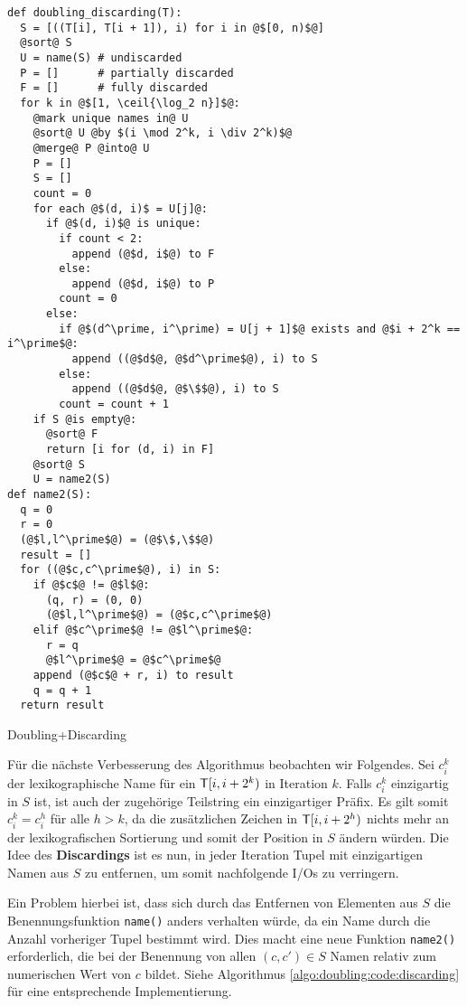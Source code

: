 \begin{listing}[htp]
\begin{verbatim}
def doubling_discarding(T):
  S = [((T[i], T[i + 1]), i) for i in @$[0, n)$@]
  @sort@ S
  U = name(S) # undiscarded
  P = []      # partially discarded
  F = []      # fully discarded
  for k in @$[1, \ceil{\log_2 n}]$@:
    @mark unique names in@ U
    @sort@ U @by $(i \mod 2^k, i \div 2^k)$@
    @merge@ P @into@ U
    P = []
    S = []
    count = 0
    for each @$(d, i)$ = U[j]@:
      if @$(d, i)$@ is unique:
        if count < 2:
          append (@$d, i$@) to F
        else:
          append (@$d, i$@) to P
        count = 0
      else:
        if @$(d^\prime, i^\prime) = U[j + 1]$@ exists and @$i + 2^k == i^\prime$@:
          append ((@$d$@, @$d^\prime$@), i) to S
        else:
          append ((@$d$@, @$\$$@), i) to S
        count = count + 1
    if S @is empty@:
      @sort@ F
      return [i for (d, i) in F]
    @sort@ S
    U = name2(S)
def name2(S):
  q = 0
  r = 0
  (@$l,l^\prime$@) = (@$\$,\$$@)
  result = []
  for ((@$c,c^\prime$@), i) in S:
    if @$c$@ != @$l$@:
      (q, r) = (0, 0)
      (@$l,l^\prime$@) = (@$c,c^\prime$@)
    elif @$c^\prime$@ != @$l^\prime$@:
      r = q
      @$l^\prime$@ = @$c^\prime$@
    append (@$c$@ + r, i) to result
    q = q + 1
  return result
\end{verbatim}
\caption{Doubling+Discarding} 
\label{algo:doubling:code:discarding}
\end{listing}

Für die nächste Verbesserung des Algorithmus beobachten wir Folgendes. Sei $c_i^k$ der lexikographische Name für ein $\inputtext{}[i, i + 2^k)$ in Iteration $k$. Falls $c_i^k$ einzigartig in $S$ ist, ist auch der zugehörige Teilstring ein einzigartiger Präfix. Es gilt somit $c_i^k = c_i^h$ für alle $h > k$, da die zusätzlichen Zeichen in $\inputtext{}[i, i + 2^h)$ nichts mehr an der lexikografischen Sortierung und somit der Position in $S$ ändern würden. Die Idee des \textbf{Discardings} ist es nun, in jeder Iteration Tupel mit einzigartigen Namen aus $S$ zu entfernen, um somit nachfolgende I/Os zu verringern. 

Ein Problem hierbei ist, dass sich durch das Entfernen von Elementen aus $S$ die Benennungsfunktion \texttt{name()} anders verhalten würde, da ein Name durch die Anzahl vorheriger Tupel bestimmt wird. Dies macht eine neue Funktion \texttt{name2()} erforderlich, die bei der Benennung von allen $(c, c') \in S$ Namen relativ zum numerischen Wert von $c$ bildet. Siehe Algorithmus \ref{algo:doubling:code:discarding} für eine entsprechende Implementierung.

